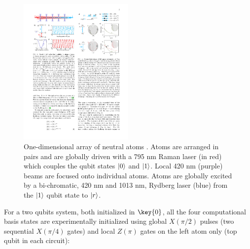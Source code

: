 \documentclass[rmp,10pt,onecolumn,fleqn,notitlepage]{revtex4-1}
\begin{document}
	\begin{figure}[h!]
	    \centering
	    \includegraphics[width=0.5\textwidth]{image/physical_implementation/one-dimensional-array.pdf}
	    \caption{One-dimensional array of neutral atoms \cite{PhysRevLett.123.170503}. Atoms are arranged in pairs and are globally driven with a 795 nm Raman laser (in red) which couples the qubit states $\left\vert{0}\right\rangle$ and $\left\vert{1}\right\rangle$. Local 420 nm (purple) beams are focused onto individual atoms. Atoms are globally excited by a bi-chromatic, 420 nm and 1013 nm, Rydberg laser (blue) from the $\left\vert{1}\right\rangle$ qubit state to $\left\vert{r}\right\rangle$. }
	    \label{fig:one-dimensional-array}
	\end{figure}

For a two qubits system, both initialized in $\key{0}$, all the four computational basis states are experimentally initialized using global $X(\pi/2)$ pulses (two sequential $X(\pi/4)$ gates) and local $Z(\pi)$ gates on the left atom only (top qubit in each circuit):
\end{document}
